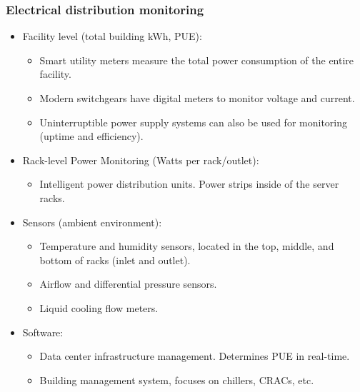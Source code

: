 \documentclass[aspectratio=169,10pt,xcolor={table,dvipsnames},t]{beamer}
\begin{document}
{
\smallframetitle
\begin{frame}
	\frametitle{Electrical distribution monitoring }
		\begin{itemize}
			\item Facility level (total building kWh, PUE):
			\begin{itemize}

				\item Smart utility meters measure the total power consumption of the entire facility. 
				\item Modern switchgears have digital meters to monitor voltage and current. 
				\item Uninterruptible power supply systems can also be used for monitoring (uptime and efficiency). 
			\end{itemize}
			
			\item Rack-level Power Monitoring (Watts per rack/outlet):
			\begin{itemize}

				\item Intelligent power distribution units. Power strips inside of the server racks. 
			\end{itemize}
			

			\item Sensors (ambient environment):
			\begin{itemize}

				\item Temperature and humidity sensors, located in the top, middle, and bottom of racks (inlet and outlet). 
				\item Airflow and differential pressure sensors.
				\item Liquid cooling flow meters.  
			\end{itemize}
			
			\item Software:
			\begin{itemize}

				\item Data center infrastructure management. Determines PUE in real-time.  
				\item Building management system, focuses on chillers, CRACs, etc. 
			\end{itemize}
		
		\end{itemize}
\end{frame}
}
\end{document}
